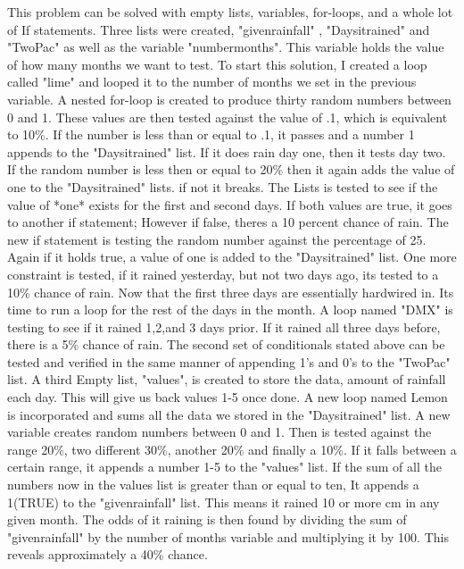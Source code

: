 \documentclass[twocolumn]{revtex4}
\begin{document}
This problem can be solved with empty lists, variables, for-loops, and a whole lot of If statements. Three lists were created, "given\textunderscore rainfall" , "Days\textunderscore it\textunderscore rained" and "Two\textunderscore Pac" as well as the variable "number\textunderscore months". This variable holds the value of how many months we want to test.  To start this solution, I created a loop called "lime" and looped it to the number of months we set in the previous variable. A nested for-loop is created to produce thirty random numbers between 0 and 1.  These values are then tested against the value of .1, which is equivalent to 10\%. If the number is less than or equal to .1, it passes and a number 1 appends to the "Days\textunderscore it\textunderscore rained" list. If it does rain day one, then it tests day two. If the random number is less then or equal to 20\% then it again adds the value of one to the "Days\textunderscore it\textunderscore rained" lists. if not it breaks.  The Lists is tested to see if the value of *one* exists for the first and second days. If both values are true, it goes to another if statement; However if false, theres a 10 percent chance of rain. The new if statement is testing the random number against the percentage of 25. Again if it holds true, a value of one is added to the "Days\textunderscore it\textunderscore rained" list. One more constraint is tested, if it rained yesterday, but not two days ago, its tested to a 10\% chance of rain. \newline Now that the first three days are essentially hardwired in. Its time to run a loop for the rest of the days in the month. A loop named "DMX" is testing to see if it rained 1,2,and 3 days prior. If it rained all three days before, there is a 5\% chance of rain. The second set of conditionals stated above can be tested and verified in the same manner of appending 1's and 0's to the "Two\textunderscore Pac" list. A third Empty list, "values", is created to store the data, amount of rainfall each day. This will give us back values 1-5 once done. A new loop named Lemon is incorporated and sums all the data we stored in the "Days\textunderscore it\textunderscore rained" list. A new variable creates random numbers between 0 and 1. Then is tested against the range 20\%, two different 30\%, another 20\% and finally a 10\%. If it falls between a certain range, it appends a number 1-5 to the "values" list. If the sum of all the numbers now in the values list is greater than or equal to ten, It appends a 1(TRUE) to the "given\textunderscore rainfall" list. This means it rained 10 or more cm in any given month. The odds of it raining is then found by dividing the sum of "given\textunderscore rainfall" by the number of months variable and multiplying it by 100. This reveals approximately a 40\% chance. 
\end{document}
